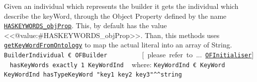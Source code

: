 \begin{description}
\begin{description}
 Given an individual which represents the builder it gets the individual 
 which describe the keyWord, through the Object Property defined by the name
 \texttt{\hyperlink{ontologyFramework.OFRunning.OFInitialising.OFBuilderCommon.HASKEYWORDS_objProp}{HASKEYWORDS_objProp}}. This, by default has the value <<@value:#HASKEYWORDS_objProp>>.
 Than, this methods uses \texttt{\hyperlink{ontologyFramework.OFDataMapping.ReservatedDataType.KeyWordsMapper.getKeyWordFromOntology(org.semanticweb.owlapi.model.OWLNamedIndividual,ontologyFramework.OFContextManagement.OWLReferences)}{getKeyWordFromOntology}}
 to map the actual literal into an array of String.  
 {\ttfamily
\mbox{ }	\verb!BuilderIndividual € OFBuilder !\mbox{ }\mbox{ }\mbox{ }\mbox{ }\mbox{ }\mbox{ }\mbox{ }\mbox{ }\mbox{ }[\mbox{ }please\mbox{ }refer\mbox{ }to\mbox{ }...\mbox{ }\texttt{\hyperlink{ontologyFramework.OFRunning.OFInitialising.OFInitialiser-class}{OFInitialiser}}]\mbox{}\newline
\mbox{ }		\verb!hasKeyWords exactly 1 KeyWordInd!\mbox{}\newline
\mbox{ }			where:	\verb!KeyWordInd € KeyWord!\mbox{}\newline
\mbox{ }						\verb!KeyWordInd hasTypeKeyWord "key1 key2 key3"^^string!\mbox{ }\mbox{}\newline
\mbox{ }}


\end{description}
\end{description}
